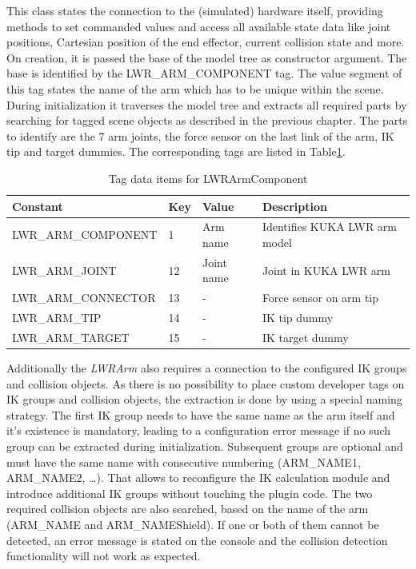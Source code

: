This class states the connection to the (simulated) hardware itself, providing methods to set commanded values and access all available state data like joint positions, Cartesian position of the end effector, current collision state and more. On creation, it is passed the base of the model tree as constructor argument. The base is identified by the LWR\_ARM\_COMPONENT tag. The value segment of this tag states the name of the arm which has to be unique within the scene. During initialization it traverses the model tree and extracts all required parts by searching for tagged scene objects as described in the previous chapter. The parts to identify are the 7 arm joints, the force sensor on the last link of the arm, IK tip and target dummies. The corresponding tags are listed in Table\ref{fig:lwr_tags}.
\begin{table}[ht]
  \centering
  \begin{tabularx}{\textwidth}{|l|l|l|X|} \hline
	\textbf{Constant} & \textbf{Key} & \textbf{Value} & \textbf{Description} \\ \hline
	LWR\_ARM\_COMPONENT & 1 & Arm name & Identifies KUKA LWR arm model \\
	LWR\_ARM\_JOINT & 12 & Joint name & Joint in KUKA LWR arm \\
	LWR\_ARM\_CONNECTOR & 13 & - & Force sensor on arm tip \\
	LWR\_ARM\_TIP & 14 & - & IK tip dummy \\
	LWR\_ARM\_TARGET & 15 & - & IK target dummy  \\ \hline
  \end{tabularx}
  \caption{Tag data items for LWRArmComponent}
  \label{fig:lwr_tags}
\end{table}
Additionally the \emph{LWRArm} also requires a connection to the configured IK groups and collision objects. As there is no possibility to place custom developer tags on IK groups and collision objects, the extraction is done by using a special naming strategy. The first IK group needs to have the same name as the arm itself and it's existence is mandatory, leading to a configuration error message if no such group can be extracted during initialization. Subsequent groups are optional and must have the same name with consecutive numbering (ARM\_NAME1, ARM\_NAME2, \ldots). That allows to reconfigure the IK calculation module and introduce additional IK groups without touching the plugin code. The two required collision objects are also searched, based on the name of the arm (ARM\_NAME and ARM\_NAMEShield). If one or both of them cannot be detected, an error message is stated on the console and the collision detection functionality will not work as expected.

